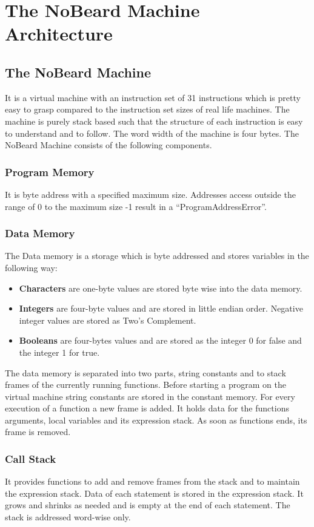 \chapter{The NoBeard Machine Architecture}
\section{The NoBeard Machine}
It is a virtual machine with an instruction set of 31 instructions which is pretty easy to grasp compared to the instruction set sizes of real life machines. The machine is purely stack based such that the structure of each instruction is easy to understand and to follow. The word width of the machine is four bytes. The NoBeard Machine consists of the following components.
\subsection{Program Memory}
It is byte address with a specified maximum size. Addresses access outside the range of 0 to the maximum size -1 result in a “ProgramAddressError”.
\subsection{Data Memory} 
\label{ssec:dataMemory}
The Data memory is a storage which is byte addressed and stores variables in the following way:
\begin{itemize}
\item \textbf{Characters }are one-byte values are stored byte wise into the data memory. 
\item \textbf{Integers }are four-byte values and are stored in little endian order. Negative integer values are stored as Two’s Complement.
\item \textbf{Booleans }are four-bytes values and are stored as the integer 0 for false and the integer 1 for true.
\end{itemize}
The data memory is separated into two parts, string constants and to stack frames of the currently running functions. Before starting a program on the virtual machine string constants are stored in the constant memory. For every execution of a function a new frame is added. It holds data for the functions arguments, local variables and its expression stack. As soon as functions ends, its frame is removed. 
\subsection{Call Stack}
It provides functions to add and remove frames from the stack and to maintain the expression stack. Data of each statement is stored in the expression stack. It grows and shrinks as needed and is empty at the end of each statement. The stack is addressed word-wise only. 

